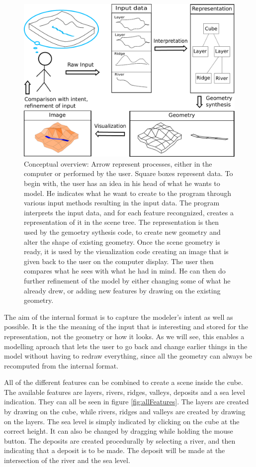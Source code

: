 \documentclass[a4paper,12pt]{report}
\begin{document}
\begin{figure}
 \includegraphics[width=\linewidth]{thesis/overviewConcept.pdf}
 \caption{Conceptual overview: Arrow represent processes, either in the computer or performed by the user. Square boxes represent data. To begin with, the user has an idea in his head of what he wants to model. He indicates what he want to create to the program through various input methods resulting in the input data. The program interprets the input data, and for each feature recongnized, creates a representation of it in the scene tree. The representation is then used by the gemoetry sythesis code, to create new geometry and alter the shape of existing geometry. Once the scene geometry is ready, it is used by the visualization code creating an image that is given back to the user on the computer display. The user then compares what he sees with what he had in mind. He can then do further refinement of the model by either changing some of what he already drew, or adding new features by drawing on the existing geometry.}
 \label{fig:overviewConcept}
\end{figure}

The aim of the internal format is to capture the modeler's intent as well as possible. It is the the meaning of the input that is interesting and stored for the representation, not the geometry or how it looks. As we will see, this enables a modelling aproach that lets the user to go back and change earlier things in the model without having to redraw everything, since all the geometry can always be recomputed from the internal format.

All of the different features can be combined to create a scene inside the cube. The available features are layers, rivers, ridges, valleys, deposits and a sea level indication. They can all be seen in figure \ref{fig:allFeatures}. The layers are created by drawing on the cube, while rivers, ridges and valleys are created by drawing on the layers. The sea level is simply indicated by clicking on the cube at the correct height. It can also be changed by dragging while holding the mouse button. The deposits are created procedurally by selecting a river, and then indicating that a deposit is to be made. The deposit will be made at the intersection of the river and the sea level.
\end{document}
